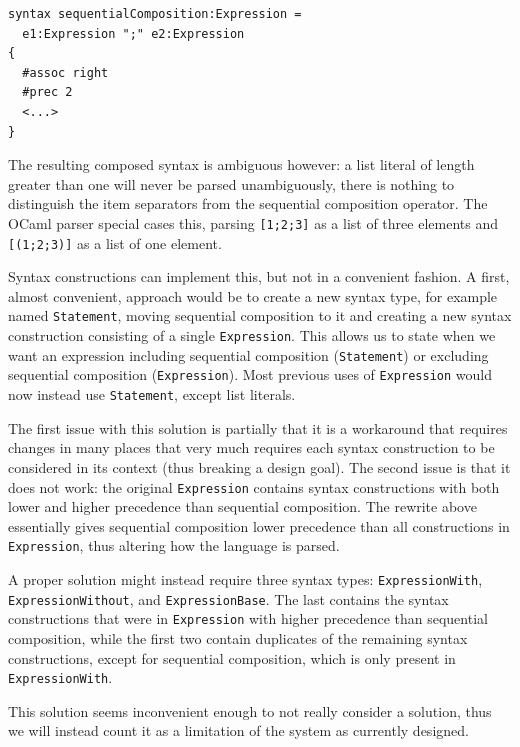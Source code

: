 \documentclass{kththesis}
\begin{document}
\begin{verbatim}
syntax sequentialComposition:Expression =
  e1:Expression ";" e2:Expression
{
  #assoc right
  #prec 2
  <...>
}
\end{verbatim}

The resulting composed syntax is ambiguous however: a list literal of length greater than one will never be parsed unambiguously, there is nothing to distinguish the item separators from the sequential composition operator. The OCaml parser special cases this, parsing \texttt{[1;2;3]} as a list of three elements and \texttt{[(1;2;3)]} as a list of one element.

Syntax constructions can implement this, but not in a convenient fashion. A first, almost convenient, approach would be to create a new syntax type, for example named \texttt{Statement}, moving sequential composition to it and creating a new syntax construction consisting of a single \texttt{Expression}. This allows us to state when we want an expression including sequential composition (\texttt{Statement}) or excluding sequential composition (\texttt{Expression}). Most previous uses of \texttt{Expression} would now instead use \texttt{Statement}, except list literals.

The first issue with this solution is partially that it is a workaround that requires changes in many places that very much requires each syntax construction to be considered in its context (thus breaking a design goal). The second issue is that it does not work: the original \texttt{Expression} contains syntax constructions with both lower and higher precedence than sequential composition. The rewrite above essentially gives sequential composition lower precedence than all constructions in \texttt{Expression}, thus altering how the language is parsed.

A proper solution might instead require three syntax types: \texttt{ExpressionWith}, \texttt{ExpressionWithout}, and \texttt{ExpressionBase}. The last contains the syntax constructions that were in \texttt{Expression} with higher precedence than sequential composition, while the first two contain duplicates of the remaining syntax constructions, except for sequential composition, which is only present in \texttt{ExpressionWith}.

This solution seems inconvenient enough to not really consider a solution, thus we will instead count it as a limitation of the system as currently designed.
\end{document}
